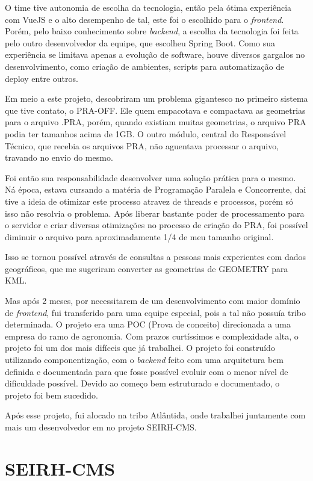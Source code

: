 O time tive autonomia de escolha da tecnologia, então pela ótima experiência com VueJS e o alto desempenho de tal, este foi o escolhido para o \textit{frontend}.
Porém, pelo baixo conhecimento sobre \textit{backend}, a escolha da tecnologia foi feita pelo outro desenvolvedor da equipe, que escolheu Spring Boot.
Como sua experiência se limitava apenas a evolução de software, houve diversos gargalos no desenvolvimento, como criação de ambientes, scripts para automatização de deploy entre outros.

Em meio a este projeto, descobriram um problema gigantesco no primeiro sistema que tive contato, o PRA-OFF. Ele quem empacotava e compactava as geometrias para o arquivo .PRA, porém, quando existiam muitas geometrias, o arquivo PRA podia ter tamanhos acima de 1GB.
O outro módulo, central do Responsável Técnico, que recebia os arquivos PRA, não aguentava processar o arquivo, travando no envio do mesmo.

Foi então sua responsabilidade desenvolver uma solução prática para o mesmo. Ná época, estava cursando a matéria de Programação Paralela e Concorrente, dai tive a ideia de otimizar este processo atravez de threads e processos, porém só isso não resolvia o problema.
Após liberar bastante poder de processamento para o servidor e criar diversas otimizações no processo de criação do PRA, foi possível diminuir o arquivo para aproximadamente 1/4 de meu tamanho original.

Isso se tornou possível através de consultas a pessoas mais experientes com dados geográficos, que me sugeriram converter as geometrias de GEOMETRY para KML.

Mas após 2 meses, por necessitarem de um desenvolvimento com maior domínio de \textit{frontend}, fui transferido para uma equipe especial, pois a tal não possuía tribo determinada.
O projeto era uma POC (Prova de conceito) direcionada a uma empresa do ramo de agronomia. Com prazos curtíssimos e complexidade alta, o projeto foi um dos mais difíceis que já trabalhei.
O projeto foi construído utilizando componentização, com o \textit{backend} feito com uma arquitetura bem definida e documentada para que fosse possível evoluir com o menor nível de dificuldade possível. Devido ao começo bem estruturado e documentado, o projeto foi bem sucedido.

Após esse projeto, fui alocado na tribo Atlântida, onde trabalhei juntamente com mais um desenvolvedor em no projeto SEIRH-CMS.

\section{SEIRH-CMS}


